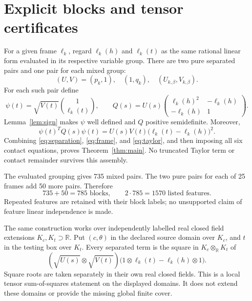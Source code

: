 \documentclass[11pt]{article}
\newcommand{\R}{\mathbb R}
\theoremstyle{definition}
\begin{document}
\section{Explicit blocks and tensor certificates}

For a given frame $\ell_k$, regard $\ell_k(h)$ and $\ell_k(t)$ as the same
rational linear form evaluated in its respective variable group. There are
two pure separated pairs and one pair for each mixed group:
\begin{equation}
 (U,V)=(p_k,1),\quad(1,q_k),\quad
 (U_{k,\beta},V_{k,\beta}).
 \label{eq:pairs}
\end{equation}
For each such pair define
\begin{equation}
 \psi(t)=\sqrt{V(t)}\binom{1}{\ell_k(t)},\qquad
 Q(s)=U(s)
 \begin{pmatrix}
 \ell_k(h)^2&-\ell_k(h)\\
 -\ell_k(h)&1
 \end{pmatrix}.
 \label{eq:gram}
\end{equation}
Lemma~\ref{lem:sign} makes $\psi$ well defined and $Q$ positive semidefinite.
Moreover,
\begin{equation}
 \psi(t)^TQ(s)\psi(t)
   =U(s)V(t)\bigl(\ell_k(t)-\ell_k(h)\bigr)^2.
 \label{eq:gramidentity}
\end{equation}
Combining \eqref{eq:separation}, \eqref{eq:frame}, and \eqref{eq:taylor}, and
then imposing all six contact equations, proves Theorem~\ref{thm:main}.
No truncated Taylor term or contact remainder survives this assembly.

The evaluated grouping gives 735 mixed pairs. The two pure pairs for each
of 25 frames add 50 more pairs. Therefore
\begin{equation}
 735+50=785\text{ blocks},\qquad 2\cdot785=1570
 \text{ listed features}.
 \label{eq:counts}
\end{equation}
Repeated features are retained with their block labels; no unsupported claim
of feature linear independence is made.

The same construction works over independently labelled real closed field
extensions $K_c,K_t\supset\R$. Put $(c,\theta)$ in the declared source domain
over $K_c$, and $t$ in the testing box over $K_t$. Every separated term is the
square in $K_c\otimes_\R K_t$ of
\begin{equation}
 (\sqrt{U(s)}\otimes\sqrt{V(t)})
 \bigl(1\otimes\ell_k(t)-\ell_k(h)\otimes1\bigr).
 \label{eq:tensorsquare}
\end{equation}
Square roots are taken separately in their own real closed fields. This is a
local tensor sum-of-squares statement on the displayed domains. It does not
extend these domains or provide the missing global finite cover.
\end{document}
